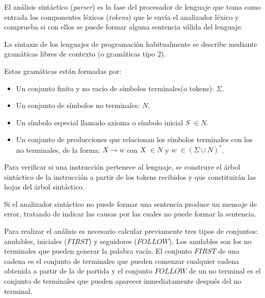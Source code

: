 

El análisis sintáctico (\textit{parser}) es la fase del procesador de lenguaje que toma como entrada los componentes léxicos (\textit{tokens}) que le envía el analizador léxico y comprueba si con ellos se puede formar alguna sentencia válida del lenguaje. 

La sintaxis de los lenguajes de programación habitualmente se describe mediante gramáticas libres de contexto (o gramáticas tipo 2).

Estas gramáticas están formadas por:
\begin{itemize}
	\item Un conjunto finito y no vacío de símbolos terminales(o tokens):  $\Sigma$.
	\item Un conjunto de símbolos no terminales:  $N$.
	\item  Un símbolo especial llamado axioma o símbolo inicial $S$ $\in N$.
	\item Un conjunto de producciones que relacionan los símbolos terminales con los no terminales, de la forma:
$ X\rightarrow w$ con $X$ $\in N$ y $w$ $\in(\Sigma\cup N)^{*}$.

\end{itemize}

%

Para verificar si una instrucción pertenece al lenguaje, se construye el árbol sintáctico de la instrucción a partir de los tokens recibidos y que constituirán las hojas del árbol sintáctico. 

Si el analizador sintáctico no puede formar una sentencia produce un mensaje de error, tratando de indicar las causas por las cuales no puede formar la sentencia. 

Para realizar el análisis es necesario calcular previamente tres tipos de conjuntos: anulables, iniciales ($FIRST$) y seguidores ($FOLLOW$). Los anulables son los no terminales que pueden generar la palabra vacía. El conjunto $FIRST$ de una cadena es el conjunto de terminales que pueden comenzar cualquier cadena obtenida a partir de la de partida y el conjunto $FOLLOW$ de un no terminal es el conjunto de terminales que pueden aparecer inmediatamente después del no terminal.

